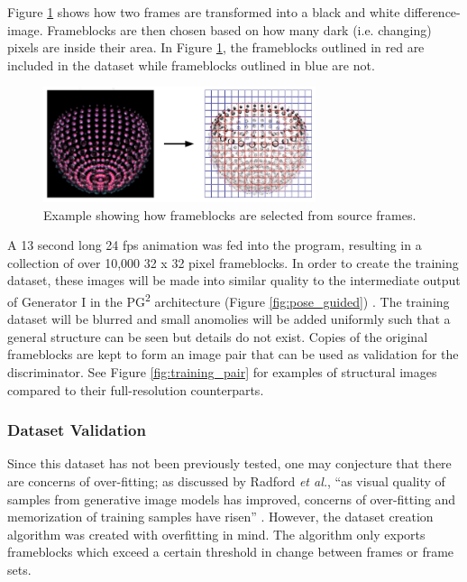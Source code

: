 \documentclass[letterpaper]{article} %
\begin{document}
Figure \ref{fig:frameblock_generation} shows how two frames
are transformed into a black and white difference-image. Frameblocks are then
chosen based on how many dark (i.e. changing) pixels are inside their area.
In Figure \ref{fig:frameblock_generation}, the frameblocks outlined in red are
included in the dataset while frameblocks outlined in blue are not.

\begin{figure}[htbp]
\centerline{\includegraphics[width=8cm]{frameblock_generation.png}}
\caption{Example showing how frameblocks are selected from source frames.}
\label{fig:frameblock_generation}
\end{figure}

A 13 second long 24 fps animation was fed into the program,
resulting in a collection of over 10,000 32 x 32 pixel frameblocks.
In order to create the training dataset, these images will be
made into similar quality
to the intermediate output of Generator I 
in the PG\textsuperscript{2} architecture
(Figure \ref{fig:pose_guided}) \cite{pose_guided_image_generation}.
The training dataset will be blurred and small anomolies will be added uniformly
such that a general structure can be seen but details do not exist.
Copies of the original frameblocks are kept to form an image pair that can be used
as validation for the discriminator.
See Figure \ref{fig:training_pair} for examples of structural images
compared to their full-resolution counterparts.

\subsubsection{Dataset Validation}
Since this dataset has not been previously tested, one may conjecture that there are
concerns of over-fitting; as discussed by Radford \textit{et al.},
``as visual quality of samples from generative image models has improved, concerns of
over-fitting and memorization of training samples have risen''
\cite{unsupervised_learning}.
However, the dataset creation algorithm was created with overfitting in mind.
The algorithm only exports frameblocks which exceed a certain threshold in change
between frames or frame sets.
\end{document}
